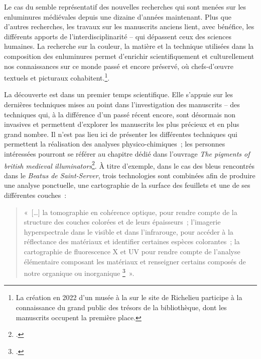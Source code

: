 Le cas du  semble représentatif des nouvelles recherches qui sont menées sur les enluminures médiévales depuis une dizaine d’années maintenant. Plus que d’autres recherches, les travaux sur les manuscrits anciens lient, avec bénéfice, les différents apports de l’interdisciplinarité – qui dépassent ceux des sciences humaines. La recherche sur la couleur, la matière et la technique utilisées dans la composition des enluminures permet d’enrichir scientifiquement et culturellement nos connaissances sur ce monde passé et encore préservé, où chefs-d’œuvre textuels et picturaux cohabitent.\footnote{La création en 2022 d’un musée à la  sur le site de Richelieu participe à la connaissance du grand public des trésors de la bibliothèque, dont les manuscrits occupent la première place.}. \par
La découverte est dans un premier temps scientifique. Elle s’appuie sur les dernières techniques mises au point dans l’investigation des manuscrits – des techniques qui, à la différence d’un passé récent encore, sont désormais non invasives et permettent d’explorer les manuscrits les plus précieux et en plus grand nombre. Il n’est pas lieu ici de présenter les différentes techniques qui permettent la réalisation des analyses physico-chimiques~; les personnes intéressées pourront se référer au chapitre dédié dans l’ouvrage \textit{The pigments of british medieval illuminators}\footcite[Pp. 1-42.][]{gameson_pigments_2023}. À titre d’exemple, dans le cas des bleus rencontrés dans le \textit{Beatus de Saint-Server}, trois technologies sont combinées afin de produire une analyse ponctuelle, une cartographie de la surface des feuillets et une de ses différentes couches~:\par 
\begin{quote}
	« […] la tomographie en cohérence optique, pour rendre compte de la structure des couches colorées et de leurs épaisseurs~; l’imagerie hyperspectrale dans le visible et dans l’infrarouge, pour accéder à la réflectance des matériaux et identifier certaines espèces colorantes~; la cartographie de fluorescence X et UV pour rendre compte de l’analyse élémentaire composant les matériaux et renseigner certains composés de notre organique ou inorganique \footcite[Pp. 78.][Ces analyses ont été réalisées par le centre de recherche et de restauration des musées de France et le Centre de recherche sur la conservation.]{denoel_beatus_2022} ». \par
\end{quote}
